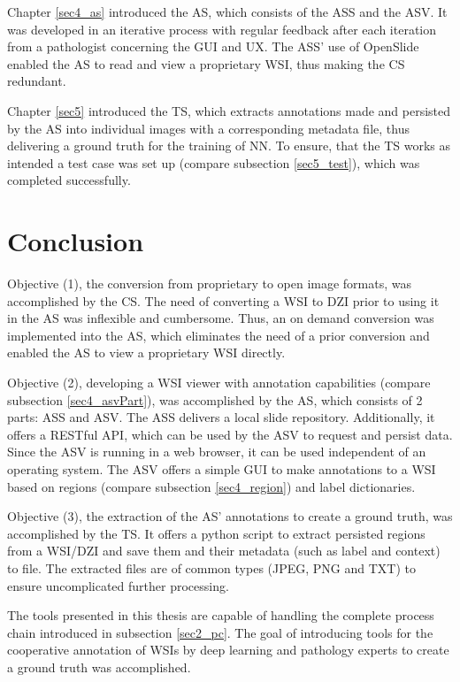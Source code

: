 Chapter \ref{sec4_as} introduced the AS, which consists of the ASS and the ASV. It was developed in an iterative process with regular feedback after each iteration from a pathologist concerning the GUI and UX. The ASS' use of OpenSlide enabled the AS to read and view a proprietary WSI, thus making the CS redundant.

Chapter \ref{sec5} introduced the TS, which extracts annotations made and persisted by the AS into individual images with a corresponding metadata file, thus delivering a ground truth for the training of NN. To ensure, that the TS works as intended a test case was set up (compare subsection \ref{sec5_test}), which was completed successfully.


\section{Conclusion}

Objective (1), the conversion from proprietary to open image formats, was accomplished by the CS. The need of converting a WSI to DZI prior to using it in the AS was inflexible and cumbersome. Thus, an on demand conversion was implemented into the AS, which eliminates the need of a prior conversion and enabled the AS to view a proprietary WSI directly.
 
Objective (2), developing a WSI viewer with annotation capabilities (compare subsection \ref{sec4_asvPart}), was accomplished by the AS, which consists of 2 parts: ASS and ASV. The ASS delivers a local slide repository. Additionally, it offers a RESTful API, which can be used by the ASV to request and persist data. Since the ASV is running in a web browser, it can be used independent of an operating system. The ASV offers a simple GUI to make annotations to a WSI based on regions (compare subsection \ref{sec4_region}) and label dictionaries.

Objective (3), the extraction of the AS' annotations to create a ground truth, was accomplished by the TS. It offers a python script to extract persisted regions from a WSI/DZI and save them and their metadata (such as label and context) to file. The extracted files are of common types (JPEG, PNG and TXT) to ensure uncomplicated further processing.

The tools presented in this thesis are capable of handling the complete process chain introduced in subsection \ref{sec2_pc}. The goal of introducing tools for the cooperative annotation of WSIs by deep learning and pathology experts to create a ground truth was accomplished.


